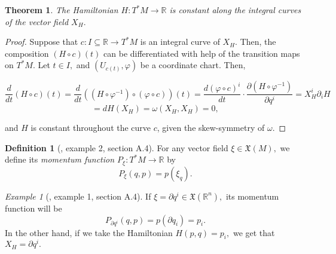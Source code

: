 \documentclass[12pt, letterpaper, reqno]{amsart}
\theoremstyle{definition}
\newtheorem{df}{Definition}
\theoremstyle{plain}
\newtheorem{thm}{Theorem}
\theoremstyle{remark}
\newtheorem{ex}{Example}
\begin{document}
\begin{thm}\label{thm:constantCurves}
The Hamiltonian $ H: T^*M \rightarrow \mathbb{R} $ is constant along the integral curves of the vector field $ X_H. $ 	
\end{thm}

\begin{proof}
	Suppose that $ c:I\subseteq \mathbb{R} \rightarrow T^*M $ is an integral curve of $ X_H. $ Then, the composition $ (H\circ c) (t) $ can be differentiated with help of the transition maps on $ T^*M. $ Let $ t\in I, $ and $ (U_{c(t)}, \varphi) $ be a coordinate chart. Then, 
		
	$$ \frac{d}{dt} (H\circ c)(t) = \frac{d}{dt} \left( \left( H\circ \varphi^{-1} \right)\circ \left( \varphi\circ c \right) \right)(t) = \frac{d(\varphi\circ c)^i}{dt}\cdot \frac{\partial (H\circ \varphi^{-1})}{\partial q^i}= X_H^i \partial_i H $$ $$= dH(X_H)=\omega(X_H, X_H)=0,$$    

	and $ H $ is constant throughout the curve $ c $, given the skew-symmetry of $ \omega $. 
\end{proof}

\begin{df}[\cite{montgomery2002tour}, example 2, section A.4]
	For any vector field $ \xi\in \mathfrak{X}(M), $ we define its \textit{ momentum function $ P_\xi:T^*M \rightarrow \mathbb{R} $} by
	$$ P_\xi(q,p)= p(\xi_q). $$ 
\end{df}

\begin{ex}[\cite{montgomery2002tour}, example 1, section A.4]
	If $ \xi=\partial q^i\in \mathfrak{X}( \mathbb{R}^n), $ its momentum function will be	
	$$ P_{\partial q^i}(q,p)=p(\partial q_i) = p_i. $$ 
	In the other hand, if we take the Hamiltonian $ H(p,q)=p_i, $ we get that $ X_H=\partial q^i. $ 
\end{ex}
\end{document}
